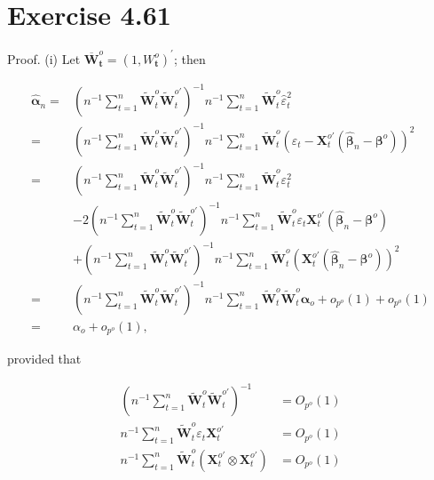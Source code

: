 \documentclass[10pt]{article}
\begin{document}
\section*{Exercise 4.61}
Proof. (i) Let $\overline{\mathbf{W}}_{\boldsymbol{t}}^{o}=\left(1, W_{\boldsymbol{t}}^{o}\right)^{\prime}$; then

$$
\begin{aligned}
\hat{\boldsymbol{\alpha}}_{n}= & \left(n^{-1} \sum_{t=1}^{n} \tilde{\mathbf{W}}_{t}^{o} \tilde{\mathbf{W}}_{t}^{o \prime}\right)^{-1} n^{-1} \sum_{t=1}^{n} \tilde{\mathbf{W}}_{t}^{o} \hat{\varepsilon}_{t}^{2} \\
= & \left(n^{-1} \sum_{t=1}^{n} \tilde{\mathbf{W}}_{t}^{o} \tilde{\mathbf{W}}_{t}^{o \prime}\right)^{-1} n^{-1} \sum_{t=1}^{n} \tilde{\mathbf{W}}_{t}^{o}\left(\varepsilon_{t}-\mathbf{X}_{t}^{o \prime}\left(\hat{\boldsymbol{\beta}}_{n}-\boldsymbol{\beta}^{o}\right)\right)^{2} \\
= & \left(n^{-1} \sum_{t=1}^{n} \tilde{\mathbf{W}}_{t}^{o} \tilde{\mathbf{W}}_{t}^{o \prime}\right)^{-1} n^{-1} \sum_{t=1}^{n} \tilde{\mathbf{W}}_{t}^{o} \varepsilon_{t}^{2} \\
& -2\left(n^{-1} \sum_{t=1}^{n} \tilde{\mathbf{W}}_{t}^{o} \tilde{\mathbf{W}}_{t}^{o \prime}\right)^{-1} n^{-1} \sum_{t=1}^{n} \tilde{\mathbf{W}}_{t}^{o} \varepsilon_{t} \mathbf{X}_{t}^{o \prime}\left(\hat{\boldsymbol{\beta}}_{n}-\boldsymbol{\beta}^{o}\right) \\
& +\left(n^{-1} \sum_{t=1}^{n} \tilde{\mathbf{W}}_{t}^{o} \tilde{\mathbf{W}}_{t}^{o \prime}\right)^{-1} n^{-1} \sum_{t=1}^{n} \tilde{\mathbf{W}}_{t}^{o}\left(\mathbf{X}_{t}^{o \prime}\left(\hat{\boldsymbol{\beta}}_{n}-\boldsymbol{\beta}^{o}\right)\right)^{2} \\
= & \left(n^{-1} \sum_{t=1}^{n} \tilde{\mathbf{W}}_{t}^{o} \tilde{\mathbf{W}}_{t}^{o \prime}\right)^{-1} n^{-1} \sum_{t=1}^{n} \tilde{\mathbf{W}}_{t}^{o} \tilde{\mathbf{W}}_{t}^{o} \boldsymbol{\alpha}_{o}+o_{p^{o}}(1)+o_{p^{o}}(1) \\
= & \alpha_{o}+o_{p^{o}}(1),
\end{aligned}
$$

provided that

$$
\begin{aligned}
\left(n^{-1} \sum_{t=1}^{n} \tilde{\mathbf{W}}_{t}^{o} \tilde{\mathbf{W}}_{t}^{o \prime}\right)^{-1} & =O_{p^{o}}(1) \\
n^{-1} \sum_{t=1}^{n} \tilde{\mathbf{W}}_{t}^{o} \varepsilon_{t} \mathbf{X}_{t}^{o \prime} & =O_{p^{o}}(1) \\
n^{-1} \sum_{t=1}^{n} \tilde{\mathbf{W}}_{t}^{o}\left(\mathbf{X}_{t}^{o \prime} \otimes \mathbf{X}_{t}^{o \prime}\right) & =O_{p^{o}}(1)
\end{aligned}
$$
\end{document}
